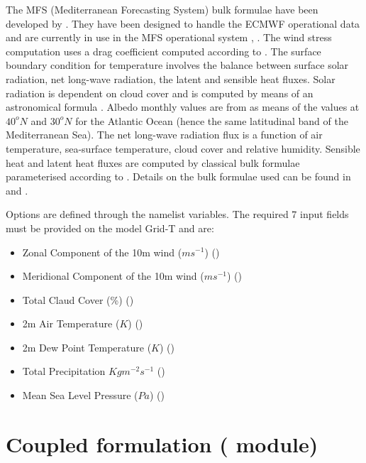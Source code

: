 \documentclass[NEMO_book]{subfiles}
\begin{document}
The MFS (Mediterranean Forecasting System) bulk formulae have been developed by
 \citet{Castellari_al_JMS1998}. 
They have been designed to handle the ECMWF operational data and are currently 
in use in the MFS operational system \citep{Tonani_al_OS08}, \citep{Oddo_al_OS09}.
The wind stress computation uses a drag coefficient computed according to \citet{Hellerman_Rosenstein_JPO83}.
The surface boundary condition for temperature involves the balance between surface solar radiation,
net long-wave radiation, the latent and sensible heat fluxes.
Solar radiation is dependent on cloud cover and is computed by means of
an astronomical formula \citep{Reed_JPO77}. Albedo monthly values are from \citet{Payne_JAS72} 
as means of the values at $40^{o}N$ and $30^{o}N$ for the Atlantic Ocean (hence the same latitudinal
band of the Mediterranean Sea). The net long-wave radiation flux
\citep{Bignami_al_JGR95} is a function of
air temperature, sea-surface temperature, cloud cover and relative humidity.
Sensible heat and latent heat fluxes are computed by classical
bulk formulae parameterised according to \citet{Kondo1975}.
Details on the bulk formulae used can be found in \citet{Maggiore_al_PCE98} and \citet{Castellari_al_JMS1998}.

Options are defined through the   namelist variables.
The required 7 input fields must be provided on the model Grid-T and  are:
\begin{itemize}
\item          Zonal Component of the 10m wind ($ms^{-1}$)  ()
\item          Meridional Component of the 10m wind ($ms^{-1}$)  ()
\item          Total Claud Cover (\%)  ()
\item          2m Air Temperature ($K$) ()
\item          2m Dew Point Temperature ($K$)  ()
\item          Total Precipitation ${Kg} m^{-2} s^{-1}$ ()
\item          Mean Sea Level Pressure (${Pa}$) ()
\end{itemize}
\section  [Coupled formulation (\textit{sbccpl}) ]
		{Coupled formulation ( module)}
\label{SBC_cpl}
\end{document}
